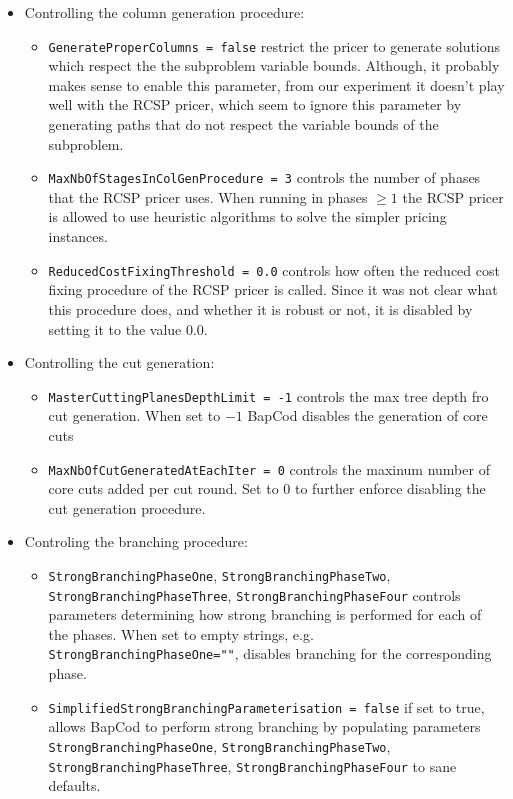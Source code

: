 \begin{itemize}
	\item Controlling the column generation procedure:
	      \begin{itemize}
		      \item \texttt{GenerateProperColumns = false} restrict the pricer to generate solutions which respect the the subproblem variable bounds.
		            Although, it probably makes sense to enable this parameter, from our experiment it doesn't play well with the RCSP pricer, which seem to ignore this parameter by generating paths that do not respect the variable bounds of the subproblem.
		      \item \texttt{MaxNbOfStagesInColGenProcedure = 3} controls the number of phases that the RCSP pricer uses.
		            When running in phases $\ge 1$ the RCSP pricer is allowed to use heuristic algorithms to solve the simpler pricing instances.
		      \item \texttt{ReducedCostFixingThreshold = 0.0} controls how often the reduced cost fixing procedure of the RCSP pricer is called.
		            Since it was not clear what this procedure does, and whether it is robust or not, it is disabled by setting it to the value $0.0$.
	      \end{itemize}

	\item Controlling the cut generation:
	      \begin{itemize}
		      \item \texttt{MasterCuttingPlanesDepthLimit = -1} controls the max tree depth fro cut generation.
		            When set to $-1$ BapCod disables the generation of core cuts
		      \item \texttt{MaxNbOfCutGeneratedAtEachIter = 0} controls the maxinum number of core cuts added per cut round.
		            Set to $0$ to further enforce disabling the cut generation procedure.
	      \end{itemize}

	\item Controling the branching procedure:
	      \begin{itemize}
		      \item \texttt{StrongBranchingPhaseOne}, \texttt{StrongBranchingPhaseTwo}, \texttt{StrongBranchingPhaseThree}, \texttt{StrongBranchingPhaseFour} controls parameters determining how strong branching is performed for each of the phases.
		            When set to empty strings, e.g. \texttt{StrongBranchingPhaseOne=""}, disables branching for the corresponding phase.
		      \item \texttt{SimplifiedStrongBranchingParameterisation = false} if set to true, allows BapCod to perform strong branching by populating parameters \texttt{StrongBranchingPhaseOne}, \texttt{StrongBranchingPhaseTwo}, \texttt{StrongBranchingPhaseThree}, \texttt{StrongBranchingPhaseFour} to sane defaults.
	      \end{itemize}


\end{itemize}
